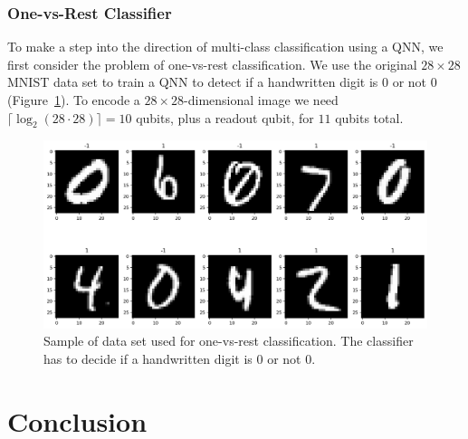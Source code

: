 \documentclass[a4paper,10pt]{article}
\begin{document}
\subsubsection{One-vs-Rest Classifier}
To make a step into the direction of multi-class classification using a QNN, we first consider the problem of one-vs-rest classification.
We use the original $28 \times 28$ MNIST data set to train a QNN to detect if a handwritten digit is 0 or not 0 (Figure~\ref{fig:mnist_ova}).
To encode a $28 \times 28$-dimensional image we need $\lceil \log_2(28 \cdot 28) \rceil = 10$ qubits, plus a readout qubit, for $11$ qubits total.
\begin{figure}[ht]
	\centering
	\includegraphics[width=.95\linewidth]{figures/mnist_28x28_ovr.png}
	\caption{Sample of data set used for one-vs-rest classification. The classifier has to decide if a handwritten digit is 0 or not 0.}
	\label{fig:mnist_ova}
\end{figure}

\section{Conclusion} \label{sec:conclusion}

\printbibliography[heading=bibintoc]
\end{document}
